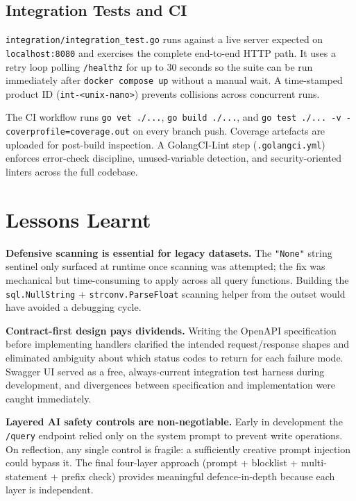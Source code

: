 \documentclass[8pt,a4paper]{article}
\begin{document}
\subsection{Integration Tests and CI}
\texttt{integration/integration\_test.go} runs against a live server expected on \texttt{localhost:8080} and exercises the complete end-to-end HTTP path. It uses a retry loop polling \texttt{/healthz} for up to 30 seconds so the suite can be run immediately after \texttt{docker compose up} without a manual wait. A time-stamped product ID (\texttt{int-<unix-nano>}) prevents collisions across concurrent runs.

The CI workflow runs \texttt{go vet ./...}, \texttt{go build ./...}, and \texttt{go test ./... -v -coverprofile=coverage.out} on every branch push. Coverage artefacts are uploaded for post-build inspection. A GolangCI-Lint step (\texttt{.golangci.yml}) enforces error-check discipline, unused-variable detection, and security-oriented linters across the full codebase.

\section{Lessons Learnt}

\textbf{Defensive scanning is essential for legacy datasets.} The \texttt{"None"} string sentinel only surfaced at runtime once scanning was attempted; the fix was mechanical but time-consuming to apply across all query functions. Building the \texttt{sql.NullString} + \texttt{strconv.ParseFloat} scanning helper from the outset would have avoided a debugging cycle.

\textbf{Contract-first design pays dividends.} Writing the OpenAPI specification before implementing handlers clarified the intended request/response shapes and eliminated ambiguity about which status codes to return for each failure mode. Swagger UI served as a free, always-current integration test harness during development, and divergences between specification and implementation were caught immediately.

\textbf{Layered AI safety controls are non-negotiable.} Early in development the \texttt{/query} endpoint relied only on the system prompt to prevent write operations. On reflection, any single control is fragile: a sufficiently creative prompt injection could bypass it. The final four-layer approach (prompt + blocklist + multi-statement + prefix check) provides meaningful defence-in-depth because each layer is independent.
\end{document}
